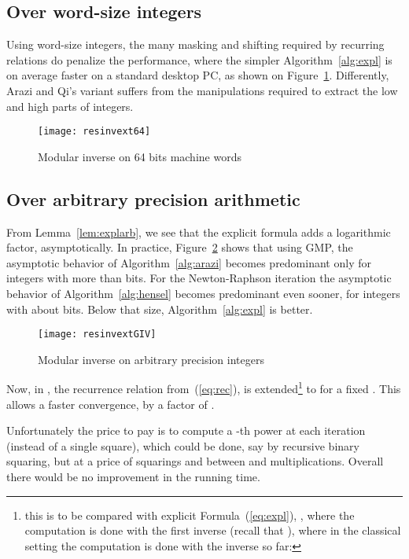 \subsection{Over word-size integers}
Using word-size integers, the many masking and shifting required by recurring
relations do penalize the performance, where the simpler Algorithm~\ref{alg:expl} is on average  faster on a
standard desktop PC, as shown on Figure~\ref{fig:uint}. Differently, Arazi and
Qi's variant suffers from the manipulations required to extract the low and high
parts of integers.
\begin{figure}[htb]\center\vspace{-2pt}
\texttt{[image: resinvext64]}
\caption{Modular inverse on 64 bits machine words}\label{fig:uint}\vspace{-2pt}
\end{figure}

\subsection{Over arbitrary precision arithmetic}
From Lemma~\ref{lem:explarb}, we see that the explicit formula adds a logarithmic factor, asymptotically. 
In practice, Figure~\ref{fig:gmp} shows that using
GMP\footnotemark[1], the asymptotic behavior of Algorithm~\ref{alg:arazi} becomes predominant only for integers with more than  bits. 
For the Newton-Raphson iteration the asymptotic behavior of Algorithm~\ref{alg:hensel} becomes predominant even sooner, for integers with about 
 bits. 
Below that size, Algorithm~\ref{alg:expl} is better.
\begin{figure}[htb]\center\vspace{-2pt}
\texttt{[image: resinvextGIV]}
\caption{Modular inverse on arbitrary precision integers}\label{fig:gmp}\vspace{-2pt}
\end{figure}

\begin{remark} 
  Now, in \cite{Krishnamurthy:1983:padic,Xenophontos:2010:fixed},
  the recurrence relation from~(\ref{eq:rec}), is extended\footnote{this is to
    be compared with explicit Formula~(\ref{eq:expl}), , where the computation is done with the first inverse  (recall that ), where in the classical setting the
    computation is done with the inverse so far: }
  to  for a fixed . 
  This allows a faster convergence, by a factor of . 

  Unfortunately the price to pay
  is to compute a -th power at each iteration (instead of a single square),
  which could be done, say by recursive binary squaring, but at a price of
   squarings and between  and  multiplications. Overall
  there would be no improvement in the running time.
\end{remark}


